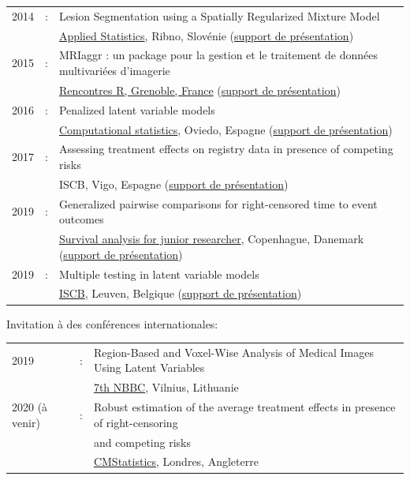 \documentclass[12pt]{article}
\begin{document}
\begin{tabular}{l@{ }l@{ }l}
2014 &:& Lesion Segmentation using a Spatially Regularized Mixture Model \\
&& \href{http://conferences.nib.si/AS2014/default.htm}{Applied Statistics}, Ribno, Slovénie \hfill (\href{https://bozenne.github.io/doc/Talks/2014-Applied_statistics-Lesion_Segmentation.pdf}{support de présentation}) \\ [3mm]
2015 &:& MRIaggr : un package pour la gestion et le traitement de données multivariées d'imagerie\\
&& \href{https://r2015-grenoble.sciencesconf.org/66037}{Rencontres R, Grenoble, France}  \hfill   (\href{https://bozenne.github.io/doc/Talks/2015-R-MRIaggr.pdf}{support de présentation})  \\ [3mm]
2016 &:& Penalized latent variable models  \\
&& \href{http://cmstatistics.org/RegistrationsV2/COMPSTAT2016/viewSubmission.php?in=440&token=29584n1s18p97n65o7p1r5n36sopq0n4}{Computational statistics}, Oviedo, Espagne \hfill (\href{https://bozenne.github.io/doc/Talks/2016-Compstat-pLVM.pdf}{support de présentation}) \\ [3mm]
2017 &:& Assessing treatment effects on registry data in presence of competing risks \\ 
&& ISCB, Vigo, Espagne \hfill (\href{https://bozenne.github.io/doc/Talks/2017-ISCB-ate.pdf}{support de présentation}) \\ [3mm]
2019 &:& Generalized pairwise comparisons for right-censored time to event outcomes \\
&& \href{https://publicifsv.sund.ku.dk/~safjr2019/}{Survival analysis for junior researcher}, Copenhague, Danemark \hfill (\href{https://bozenne.github.io/doc/Talks/2019-prezSAfJR-GPC.pdf}{support de présentation}) \\ [3mm]
2019 &:& Multiple testing in latent variable models \\
&& \href{https://kuleuvencongres.be/iscb40/}{ISCB}, Leuven, Belgique \hfill (\href{https://bozenne.github.io/doc/Talks/2019-ISCB-multcomp_LVM.pdf}{support de présentation}) \\
\end{tabular}


\clearpage

Invitation à des conférences internationales: 

\medskip

\begin{tabular}{l@{ }l@{ }l}
2019 &:& Region-Based and Voxel-Wise Analysis of Medical Images Using Latent Variables \\
&& \href{https://events.razzby.com/nbbc19/}{7th NBBC}, Vilnius, Lithuanie \\
2020 (à venir) &:& Robust estimation of the average treatment effects in presence of right-censoring \\
&& and competing risks \\
&& \href{http://www.cmstatistics.org/conferences.php}{CMStatistics}, Londres, Angleterre \\
\end{tabular}
\end{document}
